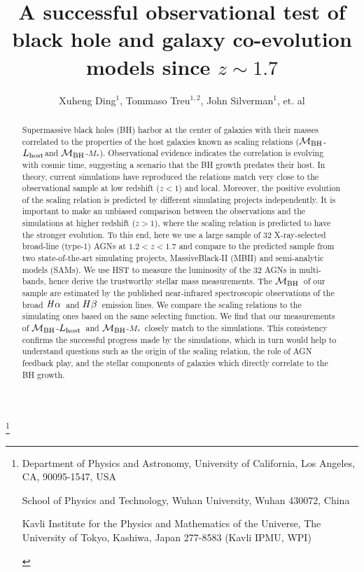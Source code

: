 \documentclass{natureprintstyle}
\title{
A successful observational test of black hole and galaxy co-evolution models since $z\sim1.7$
}
\author{Xuheng Ding$^{1}$, 
Tommaso Treu$^{1,2}$, 
John Silverman$^{1}$,
et. al
}
\newcommand{\mbh}{$\mathcal M_{\rm BH}$}
\newcommand{\lhost}{$L_{\rm host}$}
\newcommand{\halpha}{${\it H}\alpha$}
\newcommand{\hbeta}{${\it H}\beta$}
\newcommand{\mstar}{{$M_*$}}
\begin{document}
\maketitle

\let\thefootnote\relax\footnote{
\begin{affiliations}
\item {Department of Physics and Astronomy, University of California, Los Angeles, CA, 90095-1547, USA} 
\item {School of Physics and Technology, Wuhan University, Wuhan 430072, China}
\item {Kavli Institute for the Physics and Mathematics of the Universe, The University of Tokyo, Kashiwa, Japan 277-8583 (Kavli IPMU, WPI)}
\end{affiliations}
}

\begin{abstract}
Supermassive black holes (BH) harbor at the center of galaxies with their masses correlated to the properties of the host galaxies known as scaling relations (\mbh-\lhost and \mbh-\mstar). Observational evidence indicates the correlation is evolving with cosmic time, suggesting a scenario that the BH growth predates their host. In theory, current simulations have reproduced the relations match very close to the observational sample at low redshift ($z<1$) and local. Moreover, the positive evolution of the scaling relation is predicted by different simulating projects independently. It is important to make an unbiased comparison between the observations and the simulations at higher redshift ($z>1$), where the scaling relation is predicted to have the stronger evolution. To this end, here we use a large sample of 32 X-ray-selected broad-line (type-1) AGNs at $1.2 < z < 1.7$ and compare to the predicted sample from two state-of-the-art simulating projects, MassiveBlack-II (MBII) and semi-analytic models (SAMs). We use HST to measure the luminosity of the 32 AGNs in multi-bands, hence derive the trustworthy stellar mass measurements. The \mbh\ of our sample are estimated by the published near-infrared spectroscopic observations of the broad \halpha\ and \hbeta\ emission lines. We compare the scaling relations to the simulating ones based on the same selecting function. We find that our measurements of \mbh-\lhost\ and \mbh-\mstar\ closely match to the simulations. This consistency confirms the successful progress made by the simulations, which in turn would help to understand questions such as the origin of the scaling relation, the role of AGN feedback play, and the stellar components of galaxies which directly correlate to the BH growth.
\end{abstract}
\end{document}

